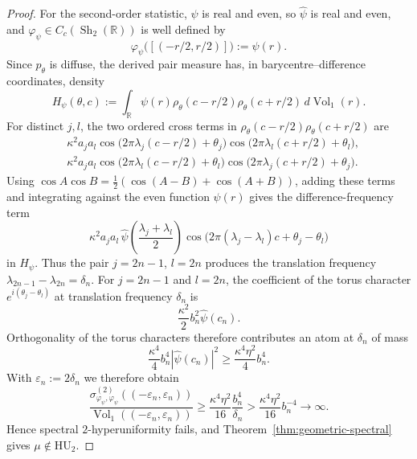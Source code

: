 \documentclass[11pt,reqno,a4paper]{amsart}
\numberwithin{equation}{section}
\theoremstyle{compact}
\theoremstyle{definition}
\theoremstyle{definition}
\newcommand{\HU}{\mathrm{HU}}
\newcommand{\Vol}{\operatorname{Vol}}
\newcommand{\Sh}{\operatorname{Sh}}
\begin{document}
\begin{proof}
For the second-order statistic, $\psi$ is real and even, so
$\widehat\psi$ is real and even, and
$\varphi_\psi\in C_c(\Sh_2(\mathbb R))$ is well defined by
\begin{equation}\label{eq:beat-pair-shape-function}
  \varphi_\psi\bigl([(-r/2,r/2)]\bigr):=\psi(r).
\end{equation}
Since $p_\theta$ is diffuse, the derived pair measure has, in
barycentre--difference coordinates, density
\begin{equation}\label{eq:beat-pair-density}
  H_\psi(\theta,c)
  :=\int_{\mathbb R}\psi(r)
     \rho_\theta(c-r/2)\rho_\theta(c+r/2)\,d\Vol_1(r).
\end{equation}
For distinct $j,l$, the two ordered cross terms in
$\rho_\theta(c-r/2)\rho_\theta(c+r/2)$ are
\begin{align*}
 &\kappa^2a_ja_l
 \cos\bigl(2\pi\lambda_j(c-r/2)+\theta_j\bigr)
 \cos\bigl(2\pi\lambda_l(c+r/2)+\theta_l\bigr),\\
 &\kappa^2a_ja_l
 \cos\bigl(2\pi\lambda_l(c-r/2)+\theta_l\bigr)
 \cos\bigl(2\pi\lambda_j(c+r/2)+\theta_j\bigr).
\end{align*}
Using $\cos A\cos B=\frac12(\cos(A-B)+\cos(A+B))$, adding these terms and
integrating against the even function $\psi(r)$ gives the difference-frequency
term
\begin{equation}\label{eq:beat-difference-frequency}
  \kappa^2a_ja_l\,
  \widehat\psi\!\left(\frac{\lambda_j+\lambda_l}{2}\right)
  \cos\bigl(2\pi(\lambda_j-\lambda_l)c+\theta_j-\theta_l\bigr)
\end{equation}
in $H_\psi$.  Thus the pair $j=2n-1$, $l=2n$ produces the translation
frequency
$\lambda_{2n-1}-\lambda_{2n}=\delta_n$.  For $j=2n-1$ and $l=2n$, the coefficient of the torus character
$e^{i(\theta_j-\theta_l)}$ at translation frequency $\delta_n$ is
\[
  \frac{\kappa^2}{2}b_n^2\widehat\psi(c_n).
\]
Orthogonality of the torus characters therefore contributes an atom at
$\delta_n$ of mass
\begin{equation}\label{eq:beat-pair-atom}
  \frac{\kappa^4}{4}b_n^4|\widehat\psi(c_n)|^2
  \geq \frac{\kappa^4\eta^2}{4}b_n^4.
\end{equation}
With $\varepsilon_n:=2\delta_n$ we therefore obtain
\begin{equation}\label{eq:beat-normalized-pair-mass}
  \frac{\sigma^{(2)}_{\varphi_\psi,\varphi_\psi}
    ((-\varepsilon_n,\varepsilon_n))}
       {\Vol_1((-\varepsilon_n,\varepsilon_n))}
  \geq
  \frac{\kappa^4\eta^2}{16}\frac{b_n^4}{\delta_n}
  >\frac{\kappa^4\eta^2}{16}b_n^{-4}
  \longrightarrow\infty.
\end{equation}
Hence spectral $2$-hyperuniformity fails, and
Theorem~\ref{thm:geometric-spectral} gives $\mu\notin\HU_2$.
\end{proof}
\end{document}
